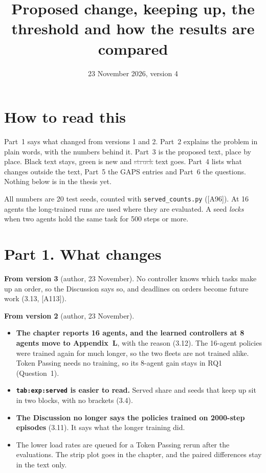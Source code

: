 \documentclass[11pt,a4paper]{article}
\title{Proposed change, keeping up, the threshold and how the results are compared}
\date{23 November 2026, version 4}
\newcommand{\new}[1]{\textcolor{newc}{#1}}
\newcommand{\old}[1]{\textcolor{gray}{\sout{#1}}}
\begin{document}
\sloppy
\maketitle

\section*{How to read this}
Part~1 says what changed from versions 1 and 2. Part~2 explains the problem in
plain words, with the numbers behind it. Part~3 is the proposed text, place
by place. Black text stays, \new{green} is new and \old{struck} text goes.
Part~4 lists what changes outside the text, Part~5 the GAPS entries and
Part~6 the questions. Nothing below is in the thesis yet.

All numbers are 20 test seeds, counted with \texttt{served\_counts.py}
([A96]). At 16 agents the long-trained runs are used where they are
evaluated. A seed \emph{locks} when two agents hold the same task for 500
steps or more.

\section*{Part 1. What changes}
\textbf{From version 3} (author, 23 November). No controller knows which
tasks make up an order, so the Discussion says so, and deadlines on orders
become future work (3.13, [A113]).

\textbf{From version 2} (author, 23 November).
\begin{itemize}[leftmargin=1.2em]
\item \textbf{The chapter reports 16 agents, and the learned controllers at
  8 agents move to Appendix~L}, with the reason (3.12). The 16-agent policies
  were trained again for much longer, so the two fleets are not trained
  alike. Token Passing needs no training, so its 8-agent gain stays in RQ1
  (Question~1).
\item \textbf{\texttt{tab:exp:served} is easier to read.} Served share and
  seeds that keep up sit in two blocks, with no brackets (3.4).
\item \textbf{The Discussion no longer says the policies trained on
  2000-step episodes} (3.11). It says what the longer training did.
\item The lower load rates are queued for a Token Passing rerun after the
  evaluations. The strip plot goes in the chapter, and the paired
  differences stay in the text only.
\end{itemize}
\end{document}
